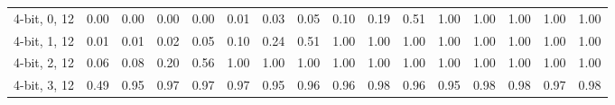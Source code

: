 \documentclass{article}
\theoremstyle{definition}
\theoremstyle{remark}
\begin{document}
\begin{table}[h]
\begin{tabular}{lrrrrrrrrrrrrrrr}
4-bit, 0, 12 & 0.00 & 0.00 & 0.00 & 0.00 & 0.01 & 0.03 & 0.05 & 0.10 & 0.19 & 0.51 & 1.00 & 1.00 & 1.00 & 1.00 & 1.00 \\
4-bit, 1, 12 & 0.01 & 0.01 & 0.02 & 0.05 & 0.10 & 0.24 & 0.51 & 1.00 & 1.00 & 1.00 & 1.00 & 1.00 & 1.00 & 1.00 & 1.00 \\
4-bit, 2, 12 & 0.06 & 0.08 & 0.20 & 0.56 & 1.00 & 1.00 & 1.00 & 1.00 & 1.00 & 1.00 & 1.00 & 1.00 & 1.00 & 1.00 & 1.00 \\
4-bit, 3, 12 & 0.49 & 0.95 & 0.97 & 0.97 & 0.97 & 0.95 & 0.96 & 0.96 & 0.98 & 0.96 & 0.95 & 0.98 & 0.98 & 0.97 & 0.98 \\
\bottomrule
\end{tabular}
\end{table}
\end{document}
